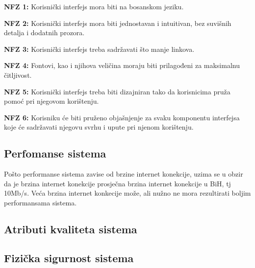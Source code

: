 \documentclass[]{report}
\begin{document}
\begin{compactitem}
\item \textbf{NFZ 1:} Korisnički interfejs mora biti na bosanskom jeziku. \vspace*{0.1cm}
 
\item \textbf{NFZ 2:} Korisnički interfejs mora biti jednostavan i intuitivan, bez suvišnih detalja i dodatnih prozora. \vspace*{0.1cm}
 
\item \textbf{NFZ 3:} Korisnički interfejs treba sadržavati što manje linkova. \vspace*{0.1cm}
 
\item \textbf{NFZ 4:} Fontovi, kao i njihova veličina moraju biti prilagođeni za maksimalnu čitljivost. \vspace*{0.1cm}
 
\item \textbf{NFZ 5:} Korisnički interfejs treba biti dizajniran tako da korisnicima pruža pomoć pri njegovom korištenju.  \vspace*{0.1cm}
 
\item \textbf{NFZ 6:} Korisniku će biti pruženo objašnjenje za svaku komponentu interfejsa koje će sadržavati njegovu svrhu i upute pri njenom korištenju. \vspace*{0.1cm}
\end{compactitem}

\subsection{Perfomanse sistema}

Pošto performanse sistema zavise od brzine internet konekcije, uzima se u obzir da je brzina internet konekcije prosječna brzina internet konekcije u BiH, tj 10Mb/s. Veća brzina internet konkecije može, ali nužno ne mora rezultirati boljim performansama sistema.

\subsection{Atributi kvaliteta sistema}

\subsection{Fizička sigurnost sistema}
\end{document}
